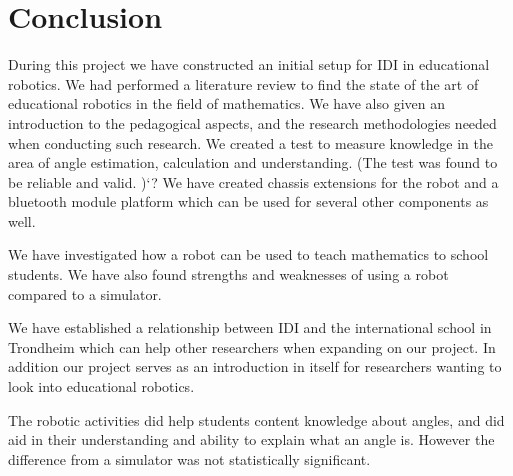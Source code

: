 \section{Conclusion}
During this project we have constructed an initial setup for IDI in educational robotics. 
We had performed a literature review to find the state of the art of educational robotics in the field of mathematics. 
We have also given an introduction to the pedagogical aspects, and the research methodologies needed when conducting such research.
We created a test to measure knowledge in the area of angle estimation, calculation and understanding. (The test was found to be reliable and valid. )`?
We have created chassis extensions for the robot and a bluetooth module platform which can be used for several other components as well.

We have investigated how a robot can be used to teach mathematics to school students. We have also found strengths and weaknesses of using a robot compared to a simulator. 

We have established a relationship between IDI and the international school in Trondheim which can help other researchers when expanding on our project. In addition our project serves as an introduction in itself for researchers wanting to look into educational robotics. 

The robotic activities did help students content knowledge about angles, and did aid in their understanding and ability to explain what an angle is. However the difference from a simulator was not statistically significant.